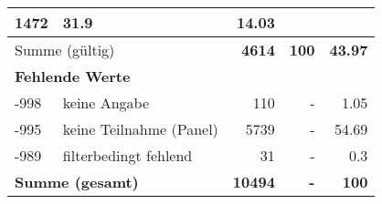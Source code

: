 \begin{longtable}{lXrrr}
       \num{1472} &
       \num[round-mode=places,round-precision=2]{31,9} &
         \num[round-mode=places,round-precision=2]{14,03} \\
     \midrule
     \multicolumn{2}{l}{Summe (gültig)} &
       \textbf{\num{4614}} &
     \textbf{100} &
       \textbf{\num[round-mode=places,round-precision=2]{43,97}} \\
     \multicolumn{5}{l}{\textbf{Fehlende Werte}}\\
       -998 &
       keine Angabe &
         \num{110} &
        - &
         \num[round-mode=places,round-precision=2]{1,05} \\
       -995 &
       keine Teilnahme (Panel) &
         \num{5739} &
        - &
         \num[round-mode=places,round-precision=2]{54,69} \\
       -989 &
       filterbedingt fehlend &
         \num{31} &
        - &
         \num[round-mode=places,round-precision=2]{0,3} \\
     \midrule
     \multicolumn{2}{l}{\textbf{Summe (gesamt)}} &
          \textbf{\num{10494}} &
        \textbf{-} &
        \textbf{100} \\
     \bottomrule
     \end{longtable}
     
